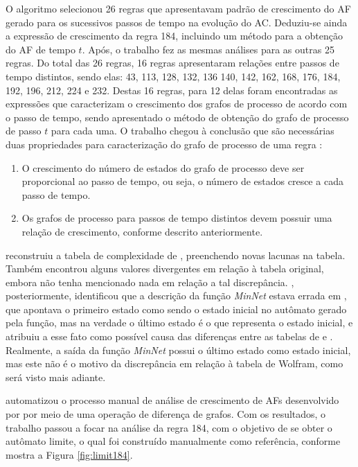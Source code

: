 \documentclass[12pt,a4paper]{article}
\begin{document}
O algoritmo selecionou 26 regras que apresentavam padrão
de crescimento do AF gerado para os sucessivos passos de tempo na evolução
do AC. Deduziu-se ainda a expressão de crescimento da regra 184, incluindo
um método para a obtenção do AF de tempo $t$. Após, o trabalho fez as mesmas
análises para as outras 25 regras. Do total das 26 regras, 16 regras
apresentaram relações entre passos de tempo distintos, sendo elas: 43, 113,
128, 132, 136 140, 142, 162, 168, 176, 184, 192, 196, 212, 224 e 232. Destas
16 regras, para 12 delas foram encontradas as expressões que caracterizam o
crescimento dos grafos de processo de acordo com o passo de tempo, sendo
apresentado o método de obtenção do grafo de processo de passo $t$ para cada uma.
O trabalho chegou à conclusão que são necessárias duas
propriedades para caracterização do grafo de processo de uma regra
:

\begin{enumerate}
\item O crescimento do número de estados do grafo de processo deve ser
proporcional ao passo de tempo, ou seja, o número de estados cresce
a cada passo de tempo.

\item Os grafos de processo para passos de tempo distintos devem possuir uma
relação de crescimento, conforme descrito anteriormente.
\end{enumerate}

 reconstruiu a tabela de complexidade de
, preenchendo novas lacunas na tabela. Também
encontrou alguns valores divergentes em relação à tabela original, embora
não tenha mencionado nada em relação a tal discrepância.
, posteriormente, identificou que a descrição da função
\emph{MinNet} estava errada em , que apontava o primeiro
estado como sendo o estado inicial no autômato gerado pela função, mas na
verdade o último estado é o que representa o estado inicial, e atribuiu
a esse fato como possível causa das diferenças entre as tabelas de
 e . Realmente, a saída
da função \emph{MinNet} possui o último estado como estado inicial, mas
este não é o motivo da discrepância em relação à tabela de Wolfram, como
será visto mais adiante.

 automatizou o processo manual de análise de crescimento
de AFs desenvolvido por  por meio de uma operação
de diferença de grafos. Com os resultados, o trabalho passou a focar na análise
da regra 184, com o objetivo de se obter o autômato limite, o qual
foi construído manualmente como referência, conforme mostra a Figura
\ref{fig:limit184}.
\end{document}
